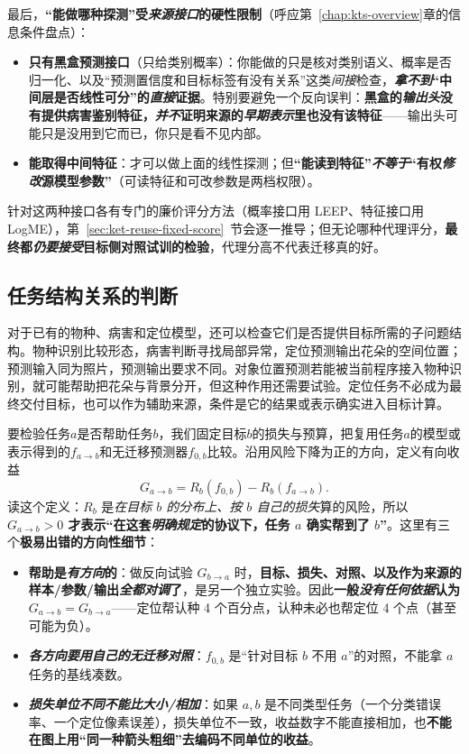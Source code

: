 最后，\textbf{“能做哪种探测”受\emph{来源接口}的硬性限制}（呼应第~\ref{chap:kts-overview}章的信息条件盘点）：
\begin{itemize}\item \textbf{只有黑盒预测接口}（只给类别概率）：你能做的只是核对类别语义、概率是否归一化、以及“预测置信度和目标标签有没有关系”这类\emph{间接}检查，\textbf{\emph{拿不到}“中间层是否线性可分”的\emph{直接}证据}。特别要避免一个反向误判：\textbf{黑盒的\emph{输出头}没有提供病害鉴别特征，\emph{并不}证明来源的\emph{早期表示}里也没有该特征}——输出头可能只是没用到它而已，你只是看不见内部。\item \textbf{能取得中间特征}：才可以做上面的线性探测；但\textbf{“能读到特征”\emph{不等于}“有权\emph{修改}源模型参数”}（可读特征和可改参数是两档权限）。\end{itemize}
针对这两种接口各有专门的廉价评分方法（概率接口用 LEEP、特征接口用 LogME），第~\ref{sec:ket-reuse-fixed-score}~节会逐一推导；但无论哪种代理评分，\textbf{最终都\emph{仍要接受}目标侧对照试训的检验}，代理分高不代表迁移真的好。

\subsection{任务结构关系的判断}
\label{sec:ket-reuse-task-relations}

对于已有的物种、病害和定位模型，还可以检查它们是否提供目标所需的子问题结构。物种识别比较形态，病害判断寻找局部异常，定位预测输出花朵的空间位置；预测输入同为照片，预测输出要求不同。对象位置预测若能被当前程序接入物种识别，就可能帮助把花朵与背景分开，但这种作用还需要试验。定位任务不必成为最终交付目标，也可以作为辅助来源，条件是它的结果或表示确实进入目标计算。

要检验任务$a$是否帮助任务$b$，我们固定目标$b$的损失与预算，把复用任务$a$的模型或表示得到的$f_{a\to b}$和无迁移预测器$f_{0,b}$比较。沿用风险下降为正的方向，定义有向收益
\begin{equation}
  G_{a\to b}=R_b(f_{0,b})-R_b(f_{a\to b}).
  \label{eq:ket-reuse-directed-gain}
\end{equation}
读这个定义：$R_b$ 是\emph{在目标 $b$ 的分布上、按 $b$ 自己的损失}算的风险，所以\textbf{$G_{a\to b}>0$ 才表示“在这套\emph{明确规定}的协议下，任务 $a$ 确实帮到了 $b$”}。这里有三个\textbf{极易出错的方向性细节}：
\begin{itemize}\item \textbf{帮助是\emph{有方向}的}：做反向试验 $G_{b\to a}$ 时，\textbf{目标、损失、对照、以及作为来源的样本/参数/输出\emph{全都对调}了}，是另一个独立实验。因此\textbf{一般\emph{没有任何依据}认为 $G_{a\to b}=G_{b\to a}$}——定位帮认种 4 个百分点，认种未必也帮定位 4 个点（甚至可能为负）。\item \textbf{\emph{各方向要用自己的无迁移对照}}：$f_{0,b}$ 是“针对目标 $b$ 不用 $a$”的对照，不能拿 $a$ 任务的基线凑数。\item \textbf{\emph{损失单位不同不能比大小/相加}}：如果 $a,b$ 是不同类型任务（一个分类错误率、一个定位像素误差），损失单位不一致，收益数字不能直接相加，也\textbf{不能在图上用“同一种箭头粗细”去编码不同单位的收益}。\end{itemize}

